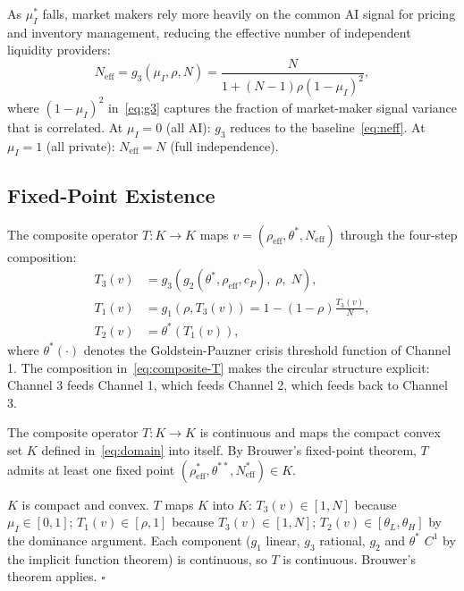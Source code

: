  As $\mu_I^*$ falls, market makers rely more heavily on the common AI signal for pricing and inventory management, reducing the effective number of independent liquidity providers:
\begin{equation}\label{eq:g3}
  N_{\text{eff}} = g_3(\mu_I, \rho, N) = \frac{N}{1+(N-1)\rho(1-\mu_I)^2},
\end{equation}
where $(1-\mu_I)^2$ in~\eqref{eq:g3} captures the fraction of market-maker signal variance that is correlated. At $\mu_I = 0$ (all AI): $g_3$ reduces to the baseline~\eqref{eq:neff}. At $\mu_I = 1$ (all private): $N_{\text{eff}} = N$ (full independence).

\subsection{Fixed-Point Existence}

The composite operator $T: K \to K$ maps $v = (\rho_{\text{eff}}, \theta^*, N_{\text{eff}})$ through the four-step composition:
\begin{equation}\label{eq:composite-T}
\begin{aligned}
  T_3(v) &= g_3\!\left(g_2(\theta^*, \rho_{\text{eff}}, c_P),\; \rho,\; N\right), \\
  T_1(v) &= g_1(\rho, T_3(v)) = 1 - (1-\rho)\frac{T_3(v)}{N}, \\
  T_2(v) &= \theta^*(T_1(v)),
\end{aligned}
\end{equation}
where $\theta^*(\cdot)$ denotes the Goldstein-Pauzner crisis threshold function of Channel 1. The composition in~\eqref{eq:composite-T} makes the circular structure explicit: Channel 3 feeds Channel 1, which feeds Channel 2, which feeds back to Channel 3.

\begin{proposition}\label{prop:fixed-point-existence}
  The composite operator $T: K \to K$ is continuous and maps the compact convex set $K$ defined in~\eqref{eq:domain} into itself. By Brouwer's fixed-point theorem, $T$ admits at least one fixed point $(\rho_{\text{eff}}^*, \theta^{**}, N_{\text{eff}}^*) \in K$.

   $K$ is compact and convex. $T$ maps $K$ into $K$: $T_3(v) \in [1, N]$ because $\mu_I \in [0,1]$; $T_1(v) \in [\rho, 1]$ because $T_3(v) \in [1, N]$; $T_2(v) \in [\theta_L, \theta_H]$ by the dominance argument. Each component ($g_1$ linear, $g_3$ rational, $g_2$ and $\theta^*$ $C^1$ by the implicit function theorem) is continuous, so $T$ is continuous. Brouwer's theorem applies. $\square$
\end{proposition}

